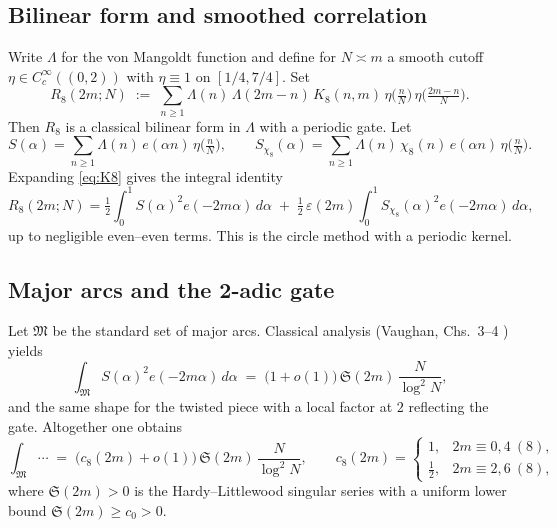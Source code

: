 \documentclass[11pt]{article}
\theoremstyle{definition}
\theoremstyle{remark}
\begin{document}
\subsection*{Bilinear form and smoothed correlation}
Write $\Lambda$ for the von Mangoldt function and define for $N\asymp m$ a smooth cutoff $\eta\in C_c^\infty((0,2))$ with $\eta\equiv 1$ on $[1/4,7/4]$. Set
\[
R_8(2m;N)\;:=\;\sum_{n\ge 1} \Lambda(n)\,\Lambda(2m{-}n)\,K_8(n,m)\,\eta\!\Big(\tfrac{n}{N}\Big)\,\eta\!\Big(\tfrac{2m-n}{N}\Big).
\]
Then $R_8$ is a classical bilinear form in $\Lambda$ with a periodic gate. Let
\[
S(\alpha)=\sum_{n\ge 1}\Lambda(n)\,e(\alpha n)\,\eta\!\Big(\tfrac{n}{N}\Big),\qquad S_{\chi_8}(\alpha)=\sum_{n\ge 1}\Lambda(n)\,\chi_8(n)\,e(\alpha n)\,\eta\!\Big(\tfrac{n}{N}\Big).
\]
Expanding \eqref{eq:K8} gives the integral identity
\[
R_8(2m;N)=\tfrac12\int_0^1 S(\alpha)^2 e(-2m\alpha)\,d\alpha\;{+}\;\tfrac12\,\varepsilon(2m)\int_0^1 S_{\chi_8}(\alpha)^2 e(-2m\alpha)\,d\alpha,
\]
up to negligible even–even terms. This is the circle method with a periodic kernel.

\subsection*{Major arcs and the 2-adic gate}
Let $\mathfrak M$ be the standard set of major arcs. Classical analysis (Vaughan, Chs.~3--4 \cite{Vaughan1997}) yields
\[
\int_{\mathfrak M} S(\alpha)^2 e(-2m\alpha)\,d\alpha\;=\;\big(1{+}o(1)\big)\,\mathfrak S(2m)\,\frac{N}{\log^2 N},
\]
and the same shape for the twisted piece with a local factor at $2$ reflecting the gate. Altogether one obtains
\begin{equation}\label{eq:major-main}
\int_{\mathfrak M}\cdots\;=\;\big(c_8(2m){+}o(1)\big)\,\mathfrak S(2m)\,\frac{N}{\log^2 N},\qquad c_8(2m)=\begin{cases}1,&2m\equiv 0,4\ (8),\\ \tfrac12,&2m\equiv 2,6\ (8),\end{cases}
\end{equation}
where $\mathfrak S(2m)>0$ is the Hardy–Littlewood singular series with a uniform lower bound $\mathfrak S(2m)\ge c_0>0$.
\end{document}
